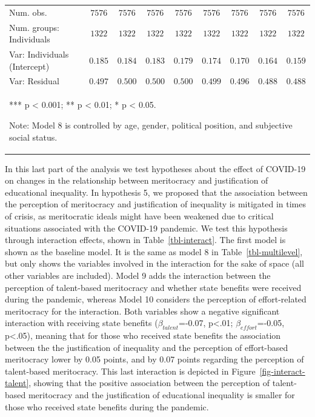 \documentclass[
]{article}
\begin{document}
\begin{table}
{\begin{center}
{\begin{tabular}{l c c c c c c c c}
Num. obs.                                   & $7576$         & $7576$         & $7576$         & $7576$         & $7576$         & $7576$         & $7576$         & $7576$         \\
Num. groups: Individuals                    & $1322$         & $1322$         & $1322$         & $1322$         & $1322$         & $1322$         & $1322$         & $1322$         \\
Var: Individuals (Intercept)                & $0.185$        & $0.184$        & $0.183$        & $0.179$        & $0.174$        & $0.170$        & $0.164$        & $0.159$        \\
Var: Residual                               & $0.497$        & $0.500$        & $0.500$        & $0.500$        & $0.499$        & $0.496$        & $0.488$        & $0.488$        \\
\hline
\multicolumn{9}{l}{\scriptsize{*** p < 0.001; ** p < 0.01; * p < 0.05. 

Note: Model 8 is controlled by age, gender, political position, and subjective social status.}}
\end{tabular}
}
\label{table:coefficients}
\end{center}

}

\end{table}%

In this last part of the analysis we test hypotheses about the effect of
COVID-19 on changes in the relationship between meritocracy and
justification of educational inequality. In hypothesis 5, we proposed
that the association between the perception of meritocracy and
justification of inequality is mitigated in times of crisis, as
meritocratic ideals might have been weakened due to critical situations
associated with the COVID-19 pandemic. We test this hypothesis through
interaction effects, shown in Table~\ref{tbl-interact}. The first model
is shown as the baseline model. It is the same as model 8 in
Table~\ref{tbl-multilevel}, but only shows the variables involved in the
interaction for the sake of space (all other variables are included).
Model 9 adds the interaction between the perception of talent-based
meritocracy and whether state benefits were received during the
pandemic, whereas Model 10 considers the perception of effort-related
meritocracy for the interaction. Both variables show a negative
significant interaction with receiving state benefits
(\(\beta_{talent}\)=-0.07, p\textless.01; \(\beta_{effort}\)=-0.05,
p\textless.05), meaning that for those who received state benefits the
association between the the justification of inequality and the
perception of effort-based meritocracy lower by 0.05 points, and by 0.07
points regarding the perception of talent-based meritocracy. This last
interaction is depicted in Figure~\ref{fig-interact-talent}, showing
that the positive association between the perception of talent-based
meritocracy and the justification of educational inequality is smaller
for those who received state benefits during the pandemic.
\end{document}
